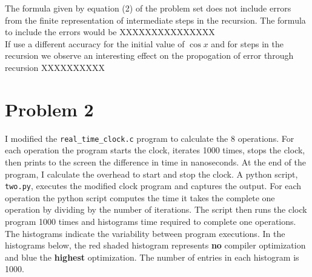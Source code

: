 \documentclass[preprint,notitlepage,nofootinbib]{revtex4-1}
\begin{document}
\indent The formula given by equation (2) of the problem set does not include errors from the finite representation of intermediate steps in the recursion. The formula to include the errors would be XXXXXXXXXXXXXXX\\
\indent If use a different accuracy for the initial value of $\cos x$ and for steps in the recursion we observe an interesting effect on the propogation of error through recursion XXXXXXXXXX
\section{Problem 2}
I modified the \verb|real_time_clock.c| program to calculate the 8 operations. For each operation the program starts the clock, iterates 1000 times, stops the clock, then prints to the screen the difference in time in nanoseconds. At the end of the program, I calculate the overhead to start and stop the clock. A python script, \verb|two.py|, executes the modified clock program and captures the output. For each operation the python script computes the time it takes the complete one operation by dividing by the number of iterations. The script then runs the clock program 1000 times and histograms time required to complete one operations. The histograms indicate the variability between program executions. In the histograms below, the red shaded histogram represents {\bf no} compiler optimization and blue the {\bf highest} optimization. The number of entries in each histogram is 1000.
\end{document}
